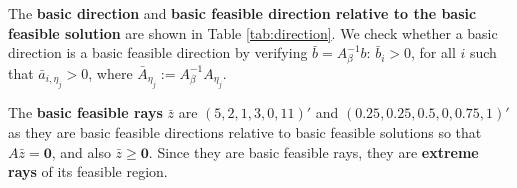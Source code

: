 The \textbf{basic direction} and \textbf{basic feasible direction relative to the basic feasible solution} are shown in Table \ref{tab:direction}. We check whether a basic direction is a basic feasible direction by verifying  $\bar{b} = A_{\beta}^{-1}b$: $\bar{b}_i > 0$, for all $i$ such that $\bar{a}_{i,\eta_j}>0$, where $\bar{A}_{\eta_j} := A_{\beta}^{-1}A_{\eta_j}$. 

The \textbf{basic feasible rays} $\bar{z}$ are $(5,2,1,3,0,11)'$ and $(0.25,0.25,0.5,0,0.75,1)'$ as they are basic feasible directions relative to basic feasible solutions so that $A\bar{z} = \mathbf{0}$, and also $\bar{z} \geq \mathbf{0}$. Since they are basic feasible rays, they are \textbf{extreme rays} of its feasible region.